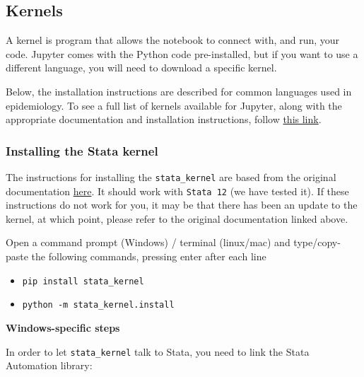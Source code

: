 \documentclass[]{book}
\providecommand{\tightlist}{%
  \setlength{\itemsep}{0pt}\setlength{\parskip}{0pt}}
\begin{document}
\hypertarget{kernels}{%
\subsection{Kernels}\label{kernels}}

A kernel is program that allows the notebook to connect with, and run, your code. Jupyter comes with the Python code pre-installed, but if you want to use a different language, you will need to download a specific kernel.

Below, the installation instructions are described for common languages used in epidemiology. To see a full list of kernels available for Jupyter, along with the appropriate documentation and installation instructions, follow \href{https://Github.com/jupyter/jupyter/wiki/Jupyter-kernels}{this link}.

\hypertarget{installing-the-stata-kernel}{%
\subsubsection{Installing the Stata kernel}\label{installing-the-stata-kernel}}

The instructions for installing the \texttt{stata\_kernel} are based from the original documentation \href{https://kylebarron.Github.io/stata_kernel/getting_started/}{here}. It should work with \texttt{Stata\ 12} (we have tested it). If these instructions do not work for you, it may be that there has been an update to the kernel, at which point, please refer to the original documentation linked above.

Open a command prompt (Windows) / terminal (linux/mac) and type/copy-paste the following commands, pressing enter after each line

\begin{itemize}
\tightlist
\item
  \texttt{pip\ install\ stata\_kernel}
\item
  \texttt{python\ -m\ stata\_kernel.install}
\end{itemize}

\textbf{Windows-specific steps}

In order to let \texttt{stata\_kernel} talk to Stata, you need to link the Stata Automation library:
\end{document}
